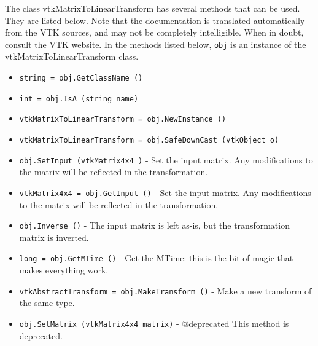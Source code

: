The class vtkMatrixToLinearTransform has several methods that can be used.
  They are listed below.
Note that the documentation is translated automatically from the VTK sources,
and may not be completely intelligible.  When in doubt, consult the VTK website.
In the methods listed below, \verb|obj| is an instance of the vtkMatrixToLinearTransform class.
\begin{itemize}
\item  \verb|string = obj.GetClassName ()|

\item  \verb|int = obj.IsA (string name)|

\item  \verb|vtkMatrixToLinearTransform = obj.NewInstance ()|

\item  \verb|vtkMatrixToLinearTransform = obj.SafeDownCast (vtkObject o)|

\item  \verb|obj.SetInput (vtkMatrix4x4 )| -  Set the input matrix.  Any modifications to the matrix will be
 reflected in the transformation.

\item  \verb|vtkMatrix4x4 = obj.GetInput ()| -  Set the input matrix.  Any modifications to the matrix will be
 reflected in the transformation.

\item  \verb|obj.Inverse ()| -  The input matrix is left as-is, but the transformation matrix
 is inverted.

\item  \verb|long = obj.GetMTime ()| -  Get the MTime: this is the bit of magic that makes everything work.

\item  \verb|vtkAbstractTransform = obj.MakeTransform ()| -  Make a new transform of the same type.

\item  \verb|obj.SetMatrix (vtkMatrix4x4 matrix)| -  @deprecated This method is deprecated.

\end{itemize}
